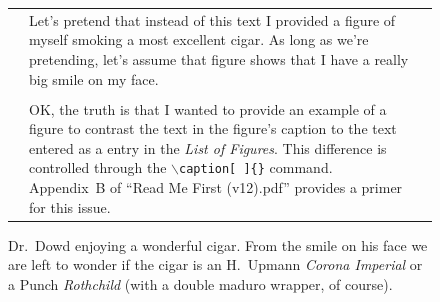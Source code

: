 \documentclass[12pt]{uthesis-v12}  %
\begin{document}
   
   
   
     \vfill
      \begin{figure}[ht]
      \begin{center}
      \begin{tabular}{|cp{5.5in}c|} \hline
      & Let's pretend that instead of this text I provided a figure
      of myself smoking a most excellent cigar.  As long as we're
      pretending, let's assume that figure shows that I have a really
      big smile on my face. & \\
      & & \\[-0.75em]
      & OK, the truth is that I wanted to provide an example of a
      figure to contrast the text in the figure's caption to the text
      entered as a entry in the \emph{List of Figures}. This
      difference is controlled through the
      $\backslash$\texttt{caption[\,]\{\}} command. Appendix~B of
      ``Read Me First (v12).pdf'' provides a primer for this issue. &
      \\ \hline
      \end{tabular}
      \caption[Dr.~Dowd enjoying a wonderful cigar.] {Dr.~Dowd
              enjoying a wonderful cigar. From the smile on his face
              we are left to wonder if the cigar is an H.~Upmann
              \emph{Corona Imperial} or a Punch \emph{Rothchild}
              (with a double maduro wrapper, of course). \label{DOWD}
              }
      \end{center}
      \end{figure}
      \vfill

\end{document}
